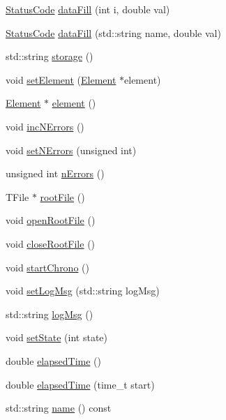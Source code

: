 \begin{DoxyCompactItemize}
\item 
\hyperlink{classStatusCode}{StatusCode} \hyperlink{classProcessus_a0d093b48f3218a088ba030e24372f18c}{dataFill} (int i, double val)
\item 
\hyperlink{classStatusCode}{StatusCode} \hyperlink{classProcessus_aa31ab71711f7af6a729441ff573f69c9}{dataFill} (std::string name, double val)
\item 
std::string \hyperlink{classProcessus_a33fa1a0b54a636e5cdd680669fd9ea51}{storage} ()
\item 
void \hyperlink{classProcessus_a8ddef94227d83d9dae2cd49aebc33353}{setElement} (\hyperlink{classElement}{Element} $\ast$element)
\item 
\hyperlink{classElement}{Element} $\ast$ \hyperlink{classProcessus_a6fe155527431a7190b7d44d600b9608d}{element} ()
\item 
void \hyperlink{classProcessus_abe603d0636f76db6aa6c5c60cf34c591}{incNErrors} ()
\item 
void \hyperlink{classProcessus_a831b027b9cf18ab56fa6147b5d3055da}{setNErrors} (unsigned int)
\item 
unsigned int \hyperlink{classProcessus_a82a0487f82f07cc2c2dc2731f98149e7}{nErrors} ()
\item 
TFile $\ast$ \hyperlink{classProcessus_a247e8c362ec08422cf53d08dd23b093c}{rootFile} ()
\item 
void \hyperlink{classProcessus_aacf6812880c1d1a2bf14a4a39458f443}{openRootFile} ()
\item 
void \hyperlink{classProcessus_a2f3c41e99da4c738ea3d8f7b0d20a665}{closeRootFile} ()
\item 
void \hyperlink{classProcessus_a5e4d34b86241fa0756e07375a14ff4b2}{startChrono} ()
\item 
void \hyperlink{classProcessus_a471833f89047aa9a7ff6200a31c17a1d}{setLogMsg} (std::string logMsg)
\item 
std::string \hyperlink{classProcessus_a42fdeb17dc13ba854222666b6aa29b61}{logMsg} ()
\item 
void \hyperlink{classProcessus_ad38cde0f1bcefa00b068e7947b8af927}{setState} (int state)
\item 
double \hyperlink{classProcessus_aecca96218c65bc805c988cd95447df55}{elapsedTime} ()
\item 
double \hyperlink{classProcessus_a06d3815ad56593dfd0d3c1f534f8b146}{elapsedTime} (time\_\-t start)
\item 
std::string \hyperlink{classObject_a975e888d50bfcbffda2c86368332a5cd}{name} () const 
\item 

\end{DoxyCompactItemize}
